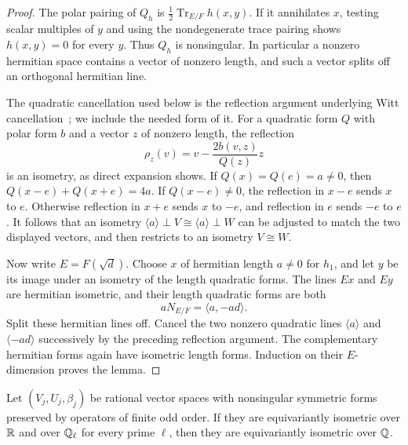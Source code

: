 \begin{proof}
The polar pairing of $Q_h$ is
$\tfrac12\operatorname{Tr}_{E/F}h(x,y)$.
If it annihilates $x$, testing scalar multiples of $y$ and using
the nondegenerate trace pairing shows $h(x,y)=0$ for every $y$.
Thus $Q_h$ is nonsingular.  In particular a nonzero hermitian space
contains a vector of nonzero length, and such a vector splits off
an orthogonal hermitian line.

The quadratic cancellation used below is the reflection argument
underlying Witt cancellation~\cite{Witt1937}; we include the needed
form of it.  For a quadratic
form $Q$ with polar form $b$ and a vector $z$ of nonzero length, the
reflection
\[
 \rho_z(v)=v-\frac{2b(v,z)}{Q(z)}z
\]
is an isometry, as direct expansion shows.  If $Q(x)=Q(e)=a\ne0$,
then $Q(x-e)+Q(x+e)=4a$.  If $Q(x-e)\ne0$, the reflection in $x-e$
sends $x$ to $e$.  Otherwise reflection in $x+e$ sends $x$ to $-e$,
and reflection in $e$ sends $-e$ to $e$.  It follows that an isometry
$\langle a\rangle\perp V\cong\langle a\rangle\perp W$ can be
adjusted to match the two displayed vectors, and then restricts to
an isometry $V\cong W$.

Now write $E=F(\sqrt d)$.  Choose $x$ of hermitian length $a\ne0$
for $h_1$, and let $y$ be its image under an isometry of the length
quadratic forms.  The lines $Ex$ and $Ey$ are hermitian isometric,
and their length quadratic forms are both
\[
 aN_{E/F}=\langle a,-ad\rangle.
\]
Split these hermitian lines off.  Cancel the two nonzero quadratic
lines $\langle a\rangle$ and $\langle-ad\rangle$ successively by
the preceding reflection argument.  The complementary hermitian
forms again have isometric length forms.  Induction on their
$E$-dimension proves the lemma.
\end{proof}

\begin{lemma}
\label{local:hasse-descent}
Let $(V_j,U_j,\beta_j)$ be rational vector spaces with nonsingular
symmetric forms preserved by operators of finite odd order.
If they are equivariantly isometric over $\mathbb R$ and over $\mathbb Q_\ell$
for every prime $\ell$, then they are equivariantly isometric over $\mathbb Q$.
\end{lemma}

